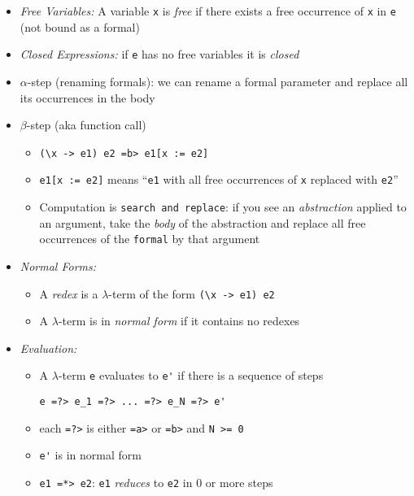 \documentclass[landscape,8pt]{extarticle}
\newcommand{\code}{\lstinline}
\begin{document}
\begin{multicols}{4}
\begin{itemize}
\begin{itemize}
              \end{itemize}
        \item \emph{Free Variables:} A variable \code{x} is \emph{free} if there exists a free occurrence of \code{x} in \code{e} (not bound as a formal)
        \item \emph{Closed Expressions:} if \code{e} has no free variables it is \emph{closed}
        \item $\alpha$-step (renaming formals): we can rename a formal parameter and replace all its occurrences in the body
        \item $\beta$-step (aka function call)
              \begin{itemize}
                  \item \code{(\x -> e1) e2 =b> e1[x := e2]}
                  \item \code{e1[x := e2]} means ``\code{e1} with all free occurrences of \code{x} replaced with \code{e2}''
                  \item Computation is \code{search and replace}: if you see an \emph{abstraction} applied to an argument, take the \emph{body} of the abstraction and replace all free occurrences of the \code{formal} by that argument
              \end{itemize}
        \item \emph{Normal Forms:}
              \begin{itemize}
                  \item A \emph{redex} is a $\lambda$-term of the form \code{(\x -> e1) e2}
                  \item A $\lambda$-term is in \emph{normal form} if it contains no redexes
              \end{itemize}
        \item \emph{Evaluation:}
              \begin{itemize}
                  \item A $\lambda$-term \code{e} evaluates to \code{e'} if there is a sequence of steps
                        \begin{lstlisting}
e =?> e_1 =?> ... =?> e_N =?> e'
                \end{lstlisting}
                  \item each \code{=?>} is either \code{=a>} or \code{=b>} and \code{N >= 0}
                  \item \code{e'} is in normal form
                  \item \code{e1 =*> e2}: \code{e1} \emph{reduces} to \code{e2} in 0 or more steps

\end{itemize}
\end{itemize}
\end{multicols}
\end{document}

